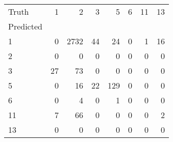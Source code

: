 \begin{tabular}{lrrrrrrr}
\toprule
Truth & 1 & 2 & 3 & 5 & 6 & 11 & 13 \\
Predicted &  &  &  &  &  &  &  \\
\midrule
1 & 0 & 2732 & 44 & 24 & 0 & 1 & 16 \\
2 & 0 & 0 & 0 & 0 & 0 & 0 & 0 \\
3 & 27 & 73 & 0 & 0 & 0 & 0 & 0 \\
5 & 0 & 16 & 22 & 129 & 0 & 0 & 0 \\
6 & 0 & 4 & 0 & 1 & 0 & 0 & 0 \\
11 & 7 & 66 & 0 & 0 & 0 & 0 & 2 \\
13 & 0 & 0 & 0 & 0 & 0 & 0 & 0 \\
\bottomrule
\end{tabular}
